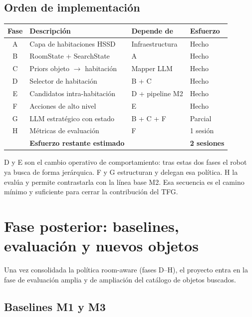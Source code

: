 \documentclass[11pt,a4paper]{article}
\begin{document}
\subsection{Orden de implementación}

\begin{center}
\begin{tabular}{clll}
\toprule
\textbf{Fase} & \textbf{Descripción} & \textbf{Depende de} & \textbf{Esfuerzo} \\
\midrule
A & Capa de habitaciones HSSD & Infraestructura & \textcolor{done}{Hecho} \\
B & RoomState + SearchState & A & \textcolor{done}{Hecho} \\
C & Priors objeto $\rightarrow$ habitación & Mapper LLM & \textcolor{done}{Hecho} \\
D & Selector de habitación & B + C & \textcolor{done}{Hecho} \\
E & Candidatos intra-habitación & D + pipeline M2 & \textcolor{done}{Hecho} \\
F & Acciones de alto nivel & E & \textcolor{done}{Hecho} \\
G & LLM estratégico con estado & B + C + F & \textcolor{partialcol}{Parcial} \\
H & Métricas de evaluación & F & 1 sesión \\
\midrule
  & \textbf{Esfuerzo restante estimado} & & \textbf{2 sesiones} \\
\bottomrule
\end{tabular}
\end{center}

D y E son el cambio operativo de comportamiento: tras estas dos fases el
robot ya busca de forma jerárquica. F y G estructuran y delegan esa
política. H la evalúa y permite contrastarla con la línea base M2. Esa
secuencia es el camino mínimo y suficiente para cerrar la contribución del
TFG.

\section{Fase posterior: baselines, evaluación y nuevos objetos}

Una vez consolidada la política room-aware (fases D--H), el proyecto entra
en la fase de evaluación amplia y de ampliación del catálogo de objetos
buscados.

\subsection{Baselines M1 y M3}
\end{document}
